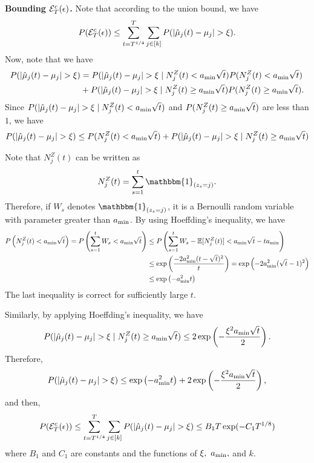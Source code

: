    \textbf{Bounding $\mathcal{E}^c_T(\epsilon)$.} Note that according to the union bound, we have
    \begin{align*}
        P(\mathcal{E}^c_T(\epsilon)) \leq \sum_{t = T^{1/4}}^T \sum_{j \in [k]} P(|\hat{\mu}_{j}(t) - \mu_{j}| > \xi).
    \end{align*}
    Now, note that we have
    \begin{align*}
        P(|\hat{\mu}_{j}(t) - \mu_{j}| > \xi) &= P(\vert \hat{\mu}_{j}(t) - \mu_{j} \vert > \xi \mid N^{Z}_j(t) < a_{\min} \sqrt{t}) P(N^{Z}_j(t) < a_{\min} \sqrt{t})  \\ 
                                           &+  P(\vert \hat{\mu}_{j}(t) - \mu_{j} \vert > \xi \mid N^{Z}_j(t) \geq a_{\min} \sqrt{t} )  P(N^{Z}_j(t) \geq a_{\min} \sqrt{t}).         
    \end{align*}
    Since $P(|\hat{\mu}_{j}(t) - \mu_{j}| > \xi \mid N^{Z}_j(t) < a_{\min} \sqrt{t})$ and $P(N^{Z}_j(t) \geq a_{\min} \sqrt{t})$ are less than $1$, we have
    $$
        P(\vert \hat{\mu}_{j}(t) - \mu_{j} \vert > \xi) \leq P(N^{Z}_j(t) < a_{\min} \sqrt{t})  + P(\lvert \hat{\mu}_{j}(t) - \mu_{j} \rvert > \xi \mid N^{Z}_j(t) \geq a_{\min} \sqrt{t} ) 
    $$

    Note that $N^{Z}_j(t)$ can be written as 
    $$
        N^{Z}_j(t) = \sum_{s = 1}^{t} \mathbbm{1}_{(z_s = j)}.
    $$
    Therefore, if $W_s$ denotes $\mathbbm{1}_{(z_s = j)}$, it is a Bernoulli random variable with parameter greater than $a_{\min}$. By using Hoeffding's inequality, we have
    \begin{align*}
        P \left( N^{Z}_j(t) < a_{\min} \sqrt{t} \right) = P \left( \sum_{s = 1}^{t} W_s < a_{\min} \sqrt{t} \right) &\leq P \left ( \sum_{s = 1}^{t} W_s - \mathbb{E}[N^{Z}_{j}(t)] < a_{\min} \sqrt{t} - ta_{\min} \right) \\
        & \leq \exp \left ( \frac{-2a_{\min}^2(t - \sqrt{t})^2}{t} \right) = \exp \left (-2a_{\min}^2(\sqrt{t} - 1)^2 \right) \\
        & \leq \exp \left (-a_{\min}^2 t \right)
    \end{align*}
    The last inequality is correct for sufficiently large $t$.

    Similarly, by applying Hoeffding's inequality, we have
    $$
        P(\lvert \hat{\mu}_{j}(t) - \mu_{j} \rvert > \xi \mid N^{Z}_j(t) \geq a_{\min} \sqrt{t} )  \leq 2 \exp \left (-\frac{\xi^2 a_{\min} \sqrt{t}}{2} \right).
    $$
    Therefore,
    $$
          P(|\hat{\mu}_{j}(t) - \mu_{j}| > \xi) \leq  \exp \left (-a_{\min}^2 t \right) +  2 \exp \left (-\frac{\xi^2 a_{\min} \sqrt{t}}{2} \right), 
    $$
    and then,
    $$
      P(\mathcal{E}^c_T(\epsilon)) \leq \sum_{t = T^{1/4}}^T \sum_{j \in [k]} P(|\hat{\mu}_{j}(t) - \mu_{j}| > \xi) \leq B_1T \exp (-C_1 T^{1/8}) 
    $$
    where $B_1$ and $C_1$ are constants and the functions of $\xi,~a_{\min},$ and $k$. 
   
